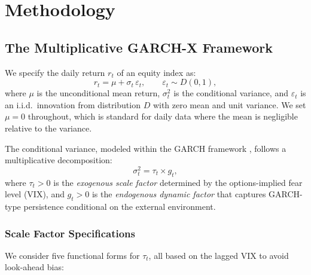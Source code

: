 \documentclass[12pt,a4paper]{article}
\begin{document}
\section{Methodology}
\label{sec:methodology}

\subsection{The Multiplicative GARCH-X Framework}
\label{sec:model_framework}

We specify the daily return $r_t$ of an equity index as:
\begin{equation}
r_t = \mu + \sigma_t \, \varepsilon_t, \qquad \varepsilon_t \sim D(0,1),
\label{eq:return}
\end{equation}
where $\mu$ is the unconditional mean return, $\sigma_t^2$ is the conditional variance, and $\varepsilon_t$ is an i.i.d.\ innovation from distribution $D$ with zero mean and unit variance. We set $\mu = 0$ throughout, which is standard for daily data where the mean is negligible relative to the variance.

The conditional variance, modeled within the GARCH framework \citep{engle1982, bollerslev1986}, follows a multiplicative decomposition:
\begin{equation}
\sigma_t^2 = \tau_t \times g_t,
\label{eq:mult}
\end{equation}
where $\tau_t > 0$ is the \emph{exogenous scale factor} determined by the options-implied fear level (VIX), and $g_t > 0$ is the \emph{endogenous dynamic factor} that captures GARCH-type persistence conditional on the external environment.

\subsubsection{Scale Factor Specifications}

We consider five functional forms for $\tau_t$, all based on the lagged VIX to avoid look-ahead bias:
\end{document}
